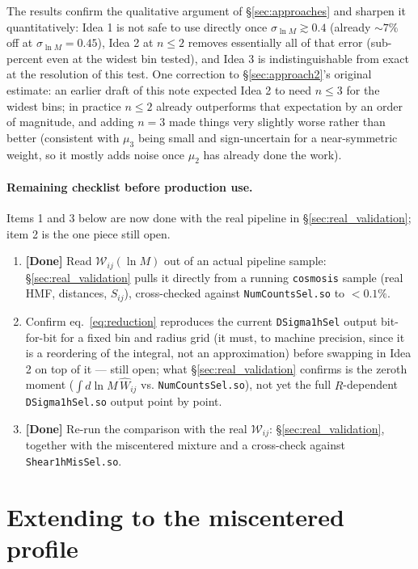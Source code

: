 \documentclass[a4paper, 11pt]{article}
\newcommand{\lnM}{\ln M}
\newcommand{\Wcal}{\mathcal{W}}
\begin{document}
The results confirm the qualitative argument of
\S\ref{sec:approaches} and sharpen it quantitatively: Idea 1 is not
safe to use directly once $\sigma_{\lnM}\gtrsim0.4$ (already
$\sim7\%$ off at $\sigma_{\lnM}=0.45$), Idea 2 at $n\le2$ removes
essentially all of that error (sub-percent even at the widest bin
tested), and Idea 3 is indistinguishable from exact at the
resolution of this test. One correction to \S\ref{sec:approach2}'s
original estimate: an earlier draft of this note expected Idea 2 to
need $n\le3$ for the widest bins; in practice $n\le2$ already
outperforms that expectation by an order of magnitude, and adding
$n=3$ made things very slightly worse rather than better (consistent
with $\mu_3$ being small and sign-uncertain for a near-symmetric
weight, so it mostly adds noise once $\mu_2$ has already done the
work).

\paragraph{Remaining checklist before production use.} Items 1 and 3
below are now done with the real pipeline in
\S\ref{sec:real_validation}; item 2 is the one piece still open.
\begin{enumerate}
\item \textbf{[Done]} Read $\Wcal_{ij}(\lnM)$ out of an actual
      pipeline sample: \S\ref{sec:real_validation} pulls it directly
      from a running \texttt{cosmosis} sample (real HMF, distances,
      $S_{ij}$), cross-checked against \texttt{NumCountsSel.so}
      to $<0.1\%$.
\item Confirm eq.~\eqref{eq:reduction} reproduces the current
      \texttt{DSigma1hSel} output bit-for-bit for a fixed bin and
      radius grid (it must, to machine precision, since it is a
      reordering of the integral, not an approximation) before
      swapping in Idea 2 on top of it --- still open; what
      \S\ref{sec:real_validation} confirms is the zeroth moment
      ($\int d\lnM\,\widehat W_{ij}$ vs. \texttt{NumCountsSel.so}),
      not yet the full $R$-dependent \texttt{DSigma1hSel.so} output
      point by point.
\item \textbf{[Done]} Re-run the comparison with the real
      $\Wcal_{ij}$: \S\ref{sec:real_validation}, together with the
      miscentered mixture and a cross-check against
      \texttt{Shear1hMisSel.so}.
\end{enumerate}

\section{Extending to the miscentered profile}
\label{sec:mis}
\end{document}
